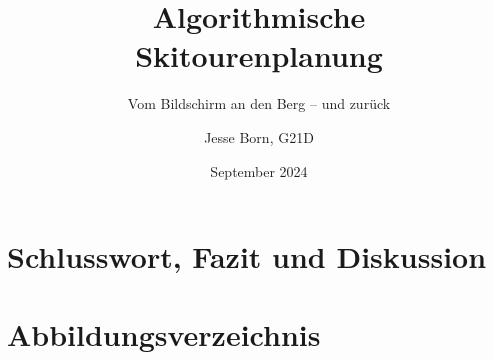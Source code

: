 \documentclass[a4paper]{scrarticle}
\title{\AKAfont\Huge\textcolor{AKSAcolor}{Algorithmische\\Skitourenplanung}}
\subtitle{Vom Bildschirm an den Berg – und zurück}
\author{Jesse Born, G21D}
\date{September 2024}
\begin{document}

\maketitle

\tableofcontents





\begin{multicols}{2}


\section{Schlusswort, Fazit und Diskussion}
\lipsum[6-10]
\clearpage

\printbibliography
\clearpage
\section{Abbildungsverzeichnis}
\lipsum[6-10]
\clearpage
\end{multicols}
\end{document}
